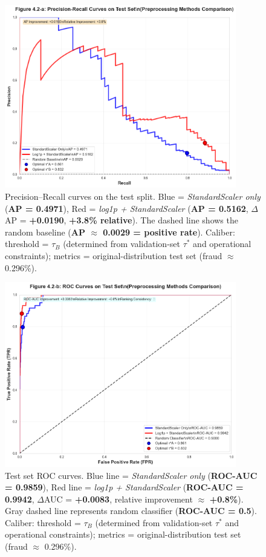 \documentclass[sigplan,screen]{acmart}
\begin{document}
\begin{figure}[h!]
    \centering
    \includegraphics[width=0.9\textwidth]{4.2a.png}
    \caption{Precision--Recall curves on the test split. Blue = \textit{StandardScaler only} (\textbf{AP = 0.4971}), Red = \textit{log1p + StandardScaler} (\textbf{AP = 0.5162}, $\Delta$AP = \textbf{+0.0190}, \textbf{+3.8\% relative}). The dashed line shows the random baseline (\textbf{AP $\approx$ 0.0029 = positive rate}). Caliber: threshold = $\tau_B$ (determined from validation-set $\tau^*$ and operational constraints); metrics = original-distribution test set (fraud $\approx$ 0.296\%).}
    \label{fig:precision_recall_curves}
\end{figure}

\begin{figure}[h!]
    \centering
    \includegraphics[width=0.9\textwidth]{4.2b.png}
    \caption{Test set ROC curves. Blue line = \textit{StandardScaler only} (\textbf{ROC-AUC = 0.9859}), Red line = \textit{log1p + StandardScaler} (\textbf{ROC-AUC = 0.9942}, $\Delta$AUC = \textbf{+0.0083}, relative improvement $\approx$ \textbf{+0.8\%}). Gray dashed line represents random classifier (\textbf{ROC-AUC = 0.5}). Caliber: threshold = $\tau_B$ (determined from validation-set $\tau^*$ and operational constraints); metrics = original-distribution test set (fraud $\approx$ 0.296\%).}
    \label{fig:roc_curves}
\end{figure}
\end{document}
